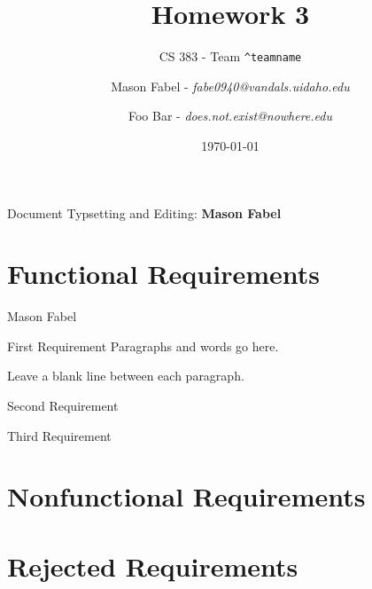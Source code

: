 \documentclass[12pt]{report}
\title{Homework 3}
\subtitle{CS 383 - Team \texttt{\textasciicircum teamname}}
\author{
Mason Fabel - \textit{fabe0940@vandals.uidaho.edu} \\
\and Foo Bar - \textit{does.not.exist@nowhere.edu} \\
}
\date{\today}
\begin{document}
\maketitle

\tableofcontents
Document Typsetting and Editing: \textbf{Mason Fabel}
\clearpage


\chapter{Functional Requirements}

\begin{section}{Mason Fabel}
\begin{subsection}{First Requirement}
Paragraphs and words go here.

Leave a blank line between each paragraph.
\end{subsection}

\begin{subsection}{Second Requirement}
\end{subsection}

\begin{subsection}{Third Requirement}
\end{subsection}
\end{section}

\chapter{Nonfunctional Requirements}

\chapter{Rejected Requirements}
\end{document}
